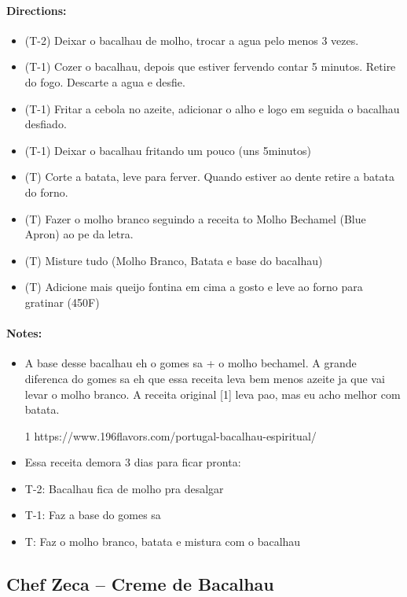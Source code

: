 \documentclass{article}
\begin{document}
\paragraph{Directions:}
\begin{itemize}
    \item (T-2) Deixar o bacalhau de molho, trocar a agua pelo menos 3 vezes.
    \item (T-1) Cozer o bacalhau, depois que estiver fervendo contar 5 minutos. Retire do fogo. Descarte a agua e desfie.
    \item (T-1) Fritar a cebola no azeite, adicionar o alho e logo em seguida o bacalhau desfiado.
    \item (T-1) Deixar o bacalhau fritando um pouco (uns 5minutos)
    \item (T) Corte a batata, leve para ferver. Quando estiver ao dente retire a batata do forno.
    \item (T) Fazer o molho branco seguindo a receita to Molho Bechamel (Blue Apron) ao pe da letra.
    \item (T) Misture tudo (Molho Branco, Batata e base do bacalhau)
    \item (T) Adicione mais queijo fontina em cima a gosto e leve ao forno para gratinar (450F)
\end{itemize}

\paragraph{Notes:}
\begin{itemize}
    \item A base desse bacalhau eh o gomes sa + o molho bechamel. A grande diferenca do gomes sa eh que essa receita leva bem menos azeite ja que vai levar o molho branco. A receita original [1] leva pao, mas eu acho melhor com batata.
    \item [1] https://www.196flavors.com/portugal-bacalhau-espiritual/
    \item Essa receita demora 3 dias para ficar pronta:
    \item T-2: Bacalhau fica de molho pra desalgar
    \item T-1: Faz a base do gomes sa
    \item T: Faz o molho branco, batata e mistura com o bacalhau
\end{itemize}

\subsection{Chef Zeca – Creme de Bacalhau}
\end{document}

